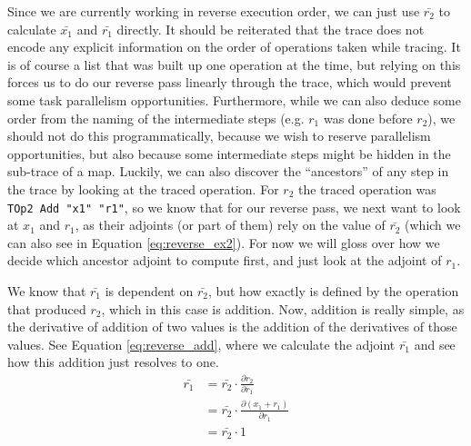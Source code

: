     Since we are currently working in reverse execution order, we can just use $\bar{r_2}$ to calculate $\bar{x_1}$ and $\bar{r_1}$ directly.
    It should be reiterated that the trace does not encode any explicit information on the order of operations taken while tracing.
    It is of course a list that was built up one operation at the time, but relying on this forces us to do our reverse pass linearly through the trace, which would prevent some task parallelism opportunities.
    Furthermore, while we can also deduce some order from the naming of the intermediate steps (e.g. $r_1$ was done before $r_2$), we should not do this programmatically, because we wish to reserve parallelism opportunities, but also because some intermediate steps might be hidden in the sub-trace of a map.
    Luckily, we can also discover the ``ancestors'' of any step in the trace by looking at the traced operation.
    For $r_2$ the traced operation was \texttt{TOp2 Add "x1" "r1"}, so we know that for our reverse pass, we next want to look at $x_1$ and $r_1$, as their adjoints (or part of them) rely on the value of $\bar{r_2}$ (which we can also see in Equation \ref{eq:reverse_ex2}).
    For now we will gloss over how we decide which ancestor adjoint to compute first, and just look at the adjoint of $r_1$.
    
    We know that $\bar{r_1}$ is dependent on $\bar{r_2}$, but how exactly is defined by the operation that produced $r_2$, which in this case is addition.
    Now, addition is really simple, as the derivative of addition of two values is the addition of the derivatives of those values.
    See Equation \ref{eq:reverse_add}, where we calculate the adjoint $\bar{r_1}$ and see how this addition just resolves to one.
    \begin{equation} \label{eq:reverse_add}
        \begin{aligned}
            \bar{r_1}&=\bar{r_2}\cdot\frac{\partial r_2}{\partial r_1}\\
            &=\bar{r_2}\cdot\frac{\partial(x_1+r_1)}{\partial r_1}\\
            &=\bar{r_2}\cdot1
        \end{aligned}
    \end{equation}


